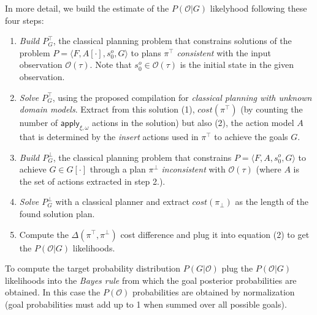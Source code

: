 \documentclass[letterpaper]{article} %
\newcommand{\tup}[1]{{\langle #1 \rangle}}
\begin{document}
In more detail, we build the estimate of the $P(\mathcal{O}|G)$ likelyhood following these four steps:
\begin{enumerate}
\item {\em Build $P^{\top}_G$}, the classical planning problem that constrains solutions of the problem $P=\tup{F,A[\cdot],s_0^o,G}$ to plans $\pi^\top$ {\em consistent} with the input observation $\mathcal{O}(\tau)$. Note that $s_0^o\in \mathcal{O}(\tau)$ is the initial state in the given observation.
\item {\em Solve $P^{\top}_G$}, using the proposed compilation for {\em classical planning with unknown domain models}. Extract from this solution (1), $cost(\pi^\top)$ (by counting the number of $\mathsf{apply_{\xi,\omega}}$ actions in the solution) but also (2), the action model $A$ that is determined by the {\em insert} actions used in $\pi^\top$ to achieve the goals $G$.
\item {\em Build $P^{\bot}_G$}, the classical planning problem that constrains $P=\tup{F,A,s_0^o,G}$ to achieve $G\in G[\cdot]$ through a plan $\pi^\bot$ {\em inconsistent} with $\mathcal{O}(\tau)$ (where $A$ is the set of actions extracted in step 2.).
\item {\em Solve $P^{\bot}_G$} with a classical planner and extract $cost(\pi_\bot)$ as the length of the found solution plan.
\item Compute the $\Delta(\pi^\top,\pi^\bot)$ cost difference and plug it into equation (2) to get the $P(\mathcal{O}|G)$ likelihoods.
\end{enumerate}

To compute the target probability distribution $P(G|\mathcal{O})$ plug the $P(\mathcal{O}|G)$ likelihoods into the {\em Bayes rule} from which the goal posterior probabilities are obtained. In this case the $P(\mathcal{O})$ probabilities are obtained by normalization (goal probabilities must add up to 1 when summed over all possible goals).
\end{document}
